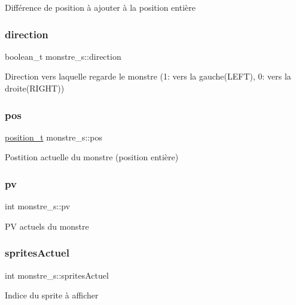 Différence de position à ajouter à la position entière \mbox{\label{structmonstre__s_aa1a2d6868b660addc5855614f1849540}} 
\subsubsection{\texorpdfstring{direction}{direction}}
{\footnotesize\ttfamily boolean\+\_\+t monstre\+\_\+s\+::direction}

Direction vers laquelle regarde le monstre (1\+: vers la gauche(\+L\+E\+F\+T), 0\+: vers la droite(\+R\+I\+G\+H\+T)) \mbox{\label{structmonstre__s_a972c2fb3087127d04bd3719d62c1030e}} 
\subsubsection{\texorpdfstring{pos}{pos}}
{\footnotesize\ttfamily \hyperlink{structposition__s}{position\+\_\+t} monstre\+\_\+s\+::pos}

Postition actuelle du monstre (position entière) \mbox{\label{structmonstre__s_a1e26c0e85b90352f9496f331ec74e98d}} 
\subsubsection{\texorpdfstring{pv}{pv}}
{\footnotesize\ttfamily int monstre\+\_\+s\+::pv}

PV actuels du monstre \mbox{\label{structmonstre__s_a94bfe0a4981f2656bbfd2ce29e4e7763}} 
\subsubsection{\texorpdfstring{sprites\+Actuel}{spritesActuel}}
{\footnotesize\ttfamily int monstre\+\_\+s\+::sprites\+Actuel}

Indice du sprite à afficher \mbox{\label{structmonstre__s_af58fb0da12d89fbdce602578f457560e}} 
